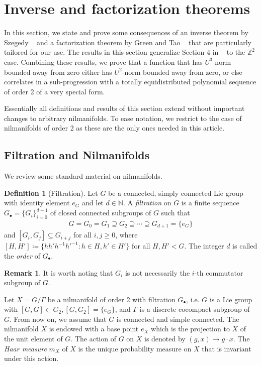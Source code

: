\documentclass[12pt,amstex]{amsart}
\theoremstyle{definition}
\newtheorem{defn}[thm]{Definition}
\newtheorem{rem}[thm]{Remark}
\begin{document}
\section{Inverse and factorization theorems}\label{S4}
In this section, we state and prove some consequences of an inverse theorem by Szegedy ~\cite{Sz} and a factorization theorem by Green and Tao ~\cite{GT} that are particularly tailored for our use. The results in this section generalize Section 4 in ~\cite{FH} to the $\mathbb{Z}^{2}$ case.
Combining these results, we prove that a function that has $U^{3}$-norm bounded away from zero either has
$U^{2}$-norm bounded away from zero, or else correlates in a sub-progression with a totally
equidistributed polynomial sequence of order 2 of a very special form.

Essentially all definitions and results of this section extend without important changes
to arbitrary nilmanifolds. To ease notation, we restrict to the case of nilmanifolds of order 2 as these are the
only ones needed in this article.

\subsection{Filtration and Nilmanifolds}
We review some standard material on nilmanifolds.
\begin{defn}[Filtration]\label{filt}
Let $G$ be a connected, simply connected Lie group with identity element $e_{G}$ and let $d\in\mathbb{N}$. A \emph{filtration} on $G$ is a finite sequence $G_{\bullet}=\{G_{i}\}_{i=0}^{d+1}$ of closed connected subgroups of $G$ such that
\begin{equation}\nonumber
  \begin{split}
    G=G_{0}=G_{1}\supseteq G_{2}\supseteq\cdots\supseteq G_{d+1}=\{e_{G}\}
  \end{split}
\end{equation}
and $[G_{i},G_{j}]\subseteq G_{i+j}$ for all $i,j\geq 0$, where $[H,H']\coloneqq \{hh'h^{-1}h'^{-1}\colon h\in H, h'\in H'\}$ for all $H,H'<G$. The integer $d$ is called the \emph{order} of $G_{\bullet}$.
\end{defn}

\begin{rem}
It is worth noting that $G_{i}$ is not necessarily the $i$-th commutator subgroup of $G$.
\end{rem}

Let $X=G/\Gamma$ be a nilmanifold of order 2 with filtration $G_{\bullet}$, i.e. $G$ is a Lie group with $[G,G]\subset G_{2},[G,G_{2}]=\{e_{G}\}$, and $\Gamma$ is a discrete cocompact subgroup of $G$. From now on, we assume that $G$ is connected and simple connected. The nilmanifold $X$ is endowed with a base point $e_{X}$ which is the projection to $X$ of the unit element of $G$. The action of $G$ on $X$ is denoted by $(g,x)\rightarrow g\cdot x$. The \emph{Haar measure} $m_{X}$ of $X$ is the unique probability measure on $X$ that is invariant under this action.
\end{document}
